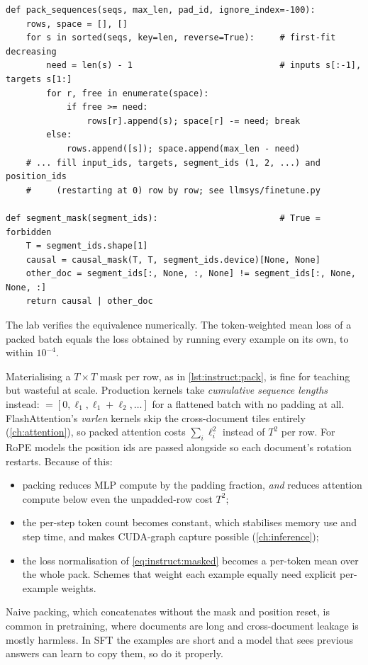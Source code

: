 \begin{lstlisting}[caption={First-fit-decreasing packing and the block-diagonal mask.},label={lst:instruct:pack}]
def pack_sequences(seqs, max_len, pad_id, ignore_index=-100):
    rows, space = [], []
    for s in sorted(seqs, key=len, reverse=True):     # first-fit decreasing
        need = len(s) - 1                             # inputs s[:-1], targets s[1:]
        for r, free in enumerate(space):
            if free >= need:
                rows[r].append(s); space[r] -= need; break
        else:
            rows.append([s]); space.append(max_len - need)
    # ... fill input_ids, targets, segment_ids (1, 2, ...) and position_ids
    #     (restarting at 0) row by row; see llmsys/finetune.py

def segment_mask(segment_ids):                        # True = forbidden
    T = segment_ids.shape[1]
    causal = causal_mask(T, T, segment_ids.device)[None, None]
    other_doc = segment_ids[:, None, :, None] != segment_ids[:, None, None, :]
    return causal | other_doc
\end{lstlisting}

The lab verifies the equivalence numerically. The token-weighted mean loss of a packed
batch equals the loss obtained by running every example on its own, to within
$10^{-4}$.

\begin{systemslens}
Materialising a $T\times T$ mask per row, as in \cref{lst:instruct:pack}, is fine for
teaching but wasteful at scale. Production kernels take \emph{cumulative sequence
lengths} instead:  $=[0, \ell_1, \ell_1+\ell_2, \dots]$ for a flattened
batch with no padding at all. FlashAttention's \emph{varlen} kernels skip the
cross-document tiles entirely (\cref{ch:attention}), so packed attention costs
$\sum_i \ell_i^2$ instead of $T^2$ per row. For RoPE models the position ids are passed
alongside so each document's rotation restarts. Because of this:
\begin{itemize}
\item packing reduces MLP compute by the padding fraction, \emph{and} reduces attention
compute below even the unpadded-row cost $T^2$;
\item the per-step token count becomes constant, which stabilises memory use and step
time, and makes CUDA-graph capture possible (\cref{ch:inference});
\item the loss normalisation of \cref{eq:instruct:masked} becomes a per-token mean over
the whole pack. Schemes that weight each example equally need explicit per-example
weights.
\end{itemize}
Naive packing, which concatenates without the mask and position reset, is common in
pretraining, where documents are long and cross-document leakage is mostly harmless.
In SFT the examples are short and a model that sees previous answers can learn to copy
them, so do it properly.
\end{systemslens}

